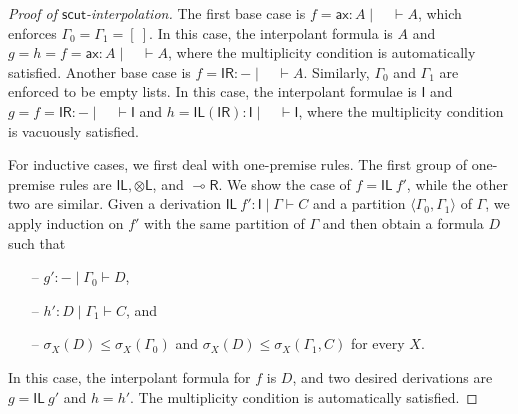 \documentclass[sn-mathphys-num]{sn-jnl}%
\newcommand{\GG}{\Gamma}
\newcommand{\vd}{\vdash}
\newcommand{\tl}{\otimes \mathsf{L}}
\newcommand{\unitl}{\mathsf{IL}}
\newcommand{\unitr}{\mathsf{IR}}
\newcommand{\ax}{\mathsf{ax}}
\newcommand{\lolli}{\multimap}
\newcommand{\lright}{{\lolli}\mathsf{R}}
\newcommand{\I}{\mathsf{I}}
\newcommand{\mf}[1]{\mathsf{#1}}
\newcommand{\gs}[1]{\sigma_{X} (#1)}
\theoremstyle{thmstyleone}%
\theoremstyle{thmstyletwo}%
\theoremstyle{thmstylethree}%
\begin{document}
\begin{proof}[Proof of $\mf{scut}$-interpolation]
The first base case is $f = \ax : A \mid \quad \vd A$, which enforces $\GG_0 = \GG_1 = [\ ]$.
In this case, the interpolant formula is $A$ and $g = h = f = \ax : A \mid \quad \vd A$, where the multiplicity condition is automatically satisfied.
Another base case is $f = \unitr : {-} \mid \quad \vd A$.
Similarly, $\GG_0$ and $\GG_1$ are enforced to be empty lists.
In this case, the interpolant formulae is $\I$ and $g = f = \unitr : {-} \mid \quad \vd \I$ and $h = \unitl (\unitr) : \I \mid \quad \vd \I$, where the multiplicity condition is vacuously satisfied.

For inductive cases, we first deal with one-premise rules.
The first group of one-premise rules are $\unitl, \tl$, and $\lright$.
We show the case of $f = \unitl \ f'$, while the other two are similar.
Given a derivation $\unitl \ f' : \I \mid \GG \vd C$ and a partition $\langle \GG_0, \GG_1 \rangle$ of $\GG$, we apply induction on $f'$ with the same partition of $\GG$ and then obtain a formula $D$ such that 
\begin{itemize}
  \item[--] $g' : {-} \mid \GG_0 \vd D$,
  \item[--] $h' : D \mid \GG_1 \vd C$, and
  \item[--] $\gs{D} \leq \gs{\GG_0}$ and $\gs{D} \leq \gs{\GG_1 , C}$ for every $X$.
\end{itemize}
In this case, the interpolant formula for $f$ is $D$, and two desired derivations are $g = \unitl \ g'$ and $h = h'$.
The multiplicity condition is automatically satisfied.


\end{proof}
\end{document}
